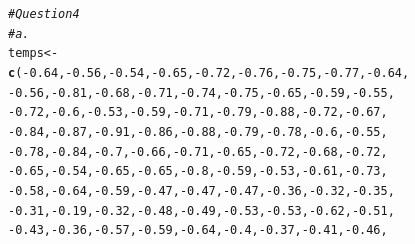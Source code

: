 \documentclass{article}\usepackage[]{graphicx}\usepackage[]{xcolor}
\makeatletter
\newcommand{\hlnum}[1]{\textcolor[rgb]{0.686,0.059,0.569}{#1}}%
\newcommand{\hlcom}[1]{\textcolor[rgb]{0.678,0.584,0.686}{\textit{#1}}}%
\newcommand{\hlopt}[1]{\textcolor[rgb]{0,0,0}{#1}}%
\newcommand{\hlstd}[1]{\textcolor[rgb]{0.345,0.345,0.345}{#1}}%
\newcommand{\hlkwb}[1]{\textcolor[rgb]{0.69,0.353,0.396}{#1}}%
\newcommand{\hlkwd}[1]{\textcolor[rgb]{0.737,0.353,0.396}{\textbf{#1}}}%
\newenvironment{kframe}{%
 \def\at@end@of@kframe{}%
 \ifinner\ifhmode%
  \def\at@end@of@kframe{\end{minipage}}%
  \begin{minipage}{\columnwidth}%
 \fi\fi%
 \def\FrameCommand##1{\hskip\@totalleftmargin \hskip-\fboxsep
 \colorbox{shadecolor}{##1}\hskip-\fboxsep
     \hskip-\linewidth \hskip-\@totalleftmargin \hskip\columnwidth}%
 \MakeFramed {\advance\hsize-\width
   \@totalleftmargin\z@ \linewidth\hsize
   \@setminipage}}%
 {\par\unskip\endMakeFramed%
 \at@end@of@kframe}
\newenvironment{knitrout}{}{} %
\makeatother
\begin{document}
\begin{knitrout}
\begin{kframe}
\begin{verbatim}
\end{verbatim}
\begin{alltt}
\hlcom{#Question 4}
\hlcom{#a.}
\hlstd{temps} \hlkwb{<-}
  \hlkwd{c}\hlstd{(}\hlopt{-}\hlnum{0.64}\hlstd{,} \hlopt{-}\hlnum{0.56}\hlstd{,} \hlopt{-}\hlnum{0.54}\hlstd{,} \hlopt{-}\hlnum{0.65}\hlstd{,} \hlopt{-}\hlnum{0.72}\hlstd{,} \hlopt{-}\hlnum{0.76}\hlstd{,} \hlopt{-}\hlnum{0.75}\hlstd{,} \hlopt{-}\hlnum{0.77}\hlstd{,} \hlopt{-}\hlnum{0.64}\hlstd{,}
    \hlopt{-}\hlnum{0.56}\hlstd{,} \hlopt{-}\hlnum{0.81}\hlstd{,} \hlopt{-}\hlnum{0.68}\hlstd{,} \hlopt{-}\hlnum{0.71}\hlstd{,} \hlopt{-}\hlnum{0.74}\hlstd{,} \hlopt{-}\hlnum{0.75}\hlstd{,} \hlopt{-}\hlnum{0.65}\hlstd{,} \hlopt{-}\hlnum{0.59}\hlstd{,} \hlopt{-}\hlnum{0.55}\hlstd{,}
    \hlopt{-}\hlnum{0.72}\hlstd{,} \hlopt{-}\hlnum{0.6}\hlstd{,} \hlopt{-}\hlnum{0.53}\hlstd{,} \hlopt{-}\hlnum{0.59}\hlstd{,} \hlopt{-}\hlnum{0.71}\hlstd{,} \hlopt{-}\hlnum{0.79}\hlstd{,} \hlopt{-}\hlnum{0.88}\hlstd{,} \hlopt{-}\hlnum{0.72}\hlstd{,} \hlopt{-}\hlnum{0.67}\hlstd{,}
    \hlopt{-}\hlnum{0.84}\hlstd{,} \hlopt{-}\hlnum{0.87}\hlstd{,} \hlopt{-}\hlnum{0.91}\hlstd{,} \hlopt{-}\hlnum{0.86}\hlstd{,} \hlopt{-}\hlnum{0.88}\hlstd{,} \hlopt{-}\hlnum{0.79}\hlstd{,} \hlopt{-}\hlnum{0.78}\hlstd{,} \hlopt{-}\hlnum{0.6}\hlstd{,} \hlopt{-}\hlnum{0.55}\hlstd{,}
    \hlopt{-}\hlnum{0.78}\hlstd{,} \hlopt{-}\hlnum{0.84}\hlstd{,} \hlopt{-}\hlnum{0.7}\hlstd{,} \hlopt{-}\hlnum{0.66}\hlstd{,} \hlopt{-}\hlnum{0.71}\hlstd{,} \hlopt{-}\hlnum{0.65}\hlstd{,} \hlopt{-}\hlnum{0.72}\hlstd{,} \hlopt{-}\hlnum{0.68}\hlstd{,} \hlopt{-}\hlnum{0.72}\hlstd{,}
    \hlopt{-}\hlnum{0.65}\hlstd{,} \hlopt{-}\hlnum{0.54}\hlstd{,} \hlopt{-}\hlnum{0.65}\hlstd{,} \hlopt{-}\hlnum{0.65}\hlstd{,} \hlopt{-}\hlnum{0.8}\hlstd{,} \hlopt{-}\hlnum{0.59}\hlstd{,} \hlopt{-}\hlnum{0.53}\hlstd{,} \hlopt{-}\hlnum{0.61}\hlstd{,} \hlopt{-}\hlnum{0.73}\hlstd{,}
    \hlopt{-}\hlnum{0.58}\hlstd{,} \hlopt{-}\hlnum{0.64}\hlstd{,} \hlopt{-}\hlnum{0.59}\hlstd{,} \hlopt{-}\hlnum{0.47}\hlstd{,} \hlopt{-}\hlnum{0.47}\hlstd{,} \hlopt{-}\hlnum{0.47}\hlstd{,} \hlopt{-}\hlnum{0.36}\hlstd{,} \hlopt{-}\hlnum{0.32}\hlstd{,} \hlopt{-}\hlnum{0.35}\hlstd{,}
    \hlopt{-}\hlnum{0.31}\hlstd{,} \hlopt{-}\hlnum{0.19}\hlstd{,} \hlopt{-}\hlnum{0.32}\hlstd{,} \hlopt{-}\hlnum{0.48}\hlstd{,} \hlopt{-}\hlnum{0.49}\hlstd{,} \hlopt{-}\hlnum{0.53}\hlstd{,} \hlopt{-}\hlnum{0.53}\hlstd{,} \hlopt{-}\hlnum{0.62}\hlstd{,} \hlopt{-}\hlnum{0.51}\hlstd{,}
    \hlopt{-}\hlnum{0.43}\hlstd{,} \hlopt{-}\hlnum{0.36}\hlstd{,} \hlopt{-}\hlnum{0.57}\hlstd{,} \hlopt{-}\hlnum{0.59}\hlstd{,} \hlopt{-}\hlnum{0.64}\hlstd{,} \hlopt{-}\hlnum{0.4}\hlstd{,} \hlopt{-}\hlnum{0.37}\hlstd{,} \hlopt{-}\hlnum{0.41}\hlstd{,} \hlopt{-}\hlnum{0.46}\hlstd{,}

\end{alltt}
\end{kframe}
\end{knitrout}
\end{document}
